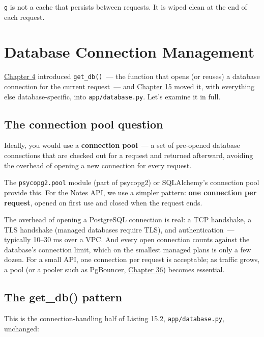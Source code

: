 \noindent{}\texttt{g} is not a cache that persists between requests. It is wiped clean at the end of each request.

\setcounter{section}{2}
\section{Database Connection Management}\label{33-logic-execution:333-database-connection-management}

\hyperref[ch:04-request-handling-paths]{Chapter 4} introduced \texttt{get\_db()}~--- the function that opens (or reuses) a database connection for the current request~--- and \hyperref[ch:15-structuring-the-application]{Chapter 15} moved it, with everything else database-specific, into \texttt{app/database.py}. Let's examine it in full.

\subsection*{The connection pool question}\label{33-logic-execution:the-connection-pool-question}

Ideally, you would use a \textbf{connection pool}~--- a set of pre-opened database connections that are checked out for a request and returned afterward, avoiding the overhead of opening a new connection for every request.

The \texttt{psycopg2.pool} module (part of psycopg2) or SQLAlchemy's connection pool provide this. For the Notes API, we use a simpler pattern: \textbf{one connection per request}, opened on first use and closed when the request ends.

The overhead of opening a PostgreSQL connection is real: a TCP handshake, a TLS handshake (managed databases require TLS), and authentication~--- typically 10--30 ms over a VPC. And every open connection counts against the database's connection limit, which on the smallest managed plans is only a few dozen. For a small API, one connection per request is acceptable; as traffic grows, a pool (or a pooler such as PgBouncer, \hyperref[ch:36-scaling-load]{Chapter 36}) becomes essential.

\subsection*{The get\_db() pattern}\label{33-logic-execution:the-get-db-pattern}

This is the connection-handling half of Listing 15.2, \texttt{app/database.py}, unchanged:

